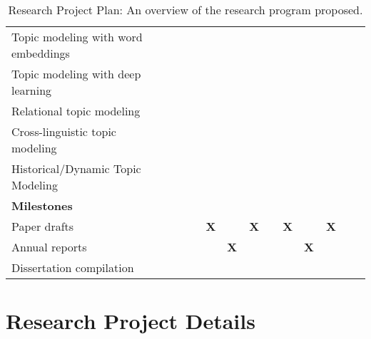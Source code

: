 \begin{table}
{\begin{tabular}{l|llcllllcllllcll|}
Topic modeling with word embeddings &  & \multicolumn{2}{l}{} & \cellcolor[HTML]{34FF34} & \cellcolor[HTML]{34FF34} &  & \multicolumn{2}{l}{} &  &  &  & \multicolumn{2}{l}{} &  &  \\
Topic modeling with deep learning &  & \multicolumn{2}{l}{} &  &  & \cellcolor[HTML]{34FF34} & \multicolumn{2}{l}{\cellcolor[HTML]{34FF34}} &  &  &  & \multicolumn{2}{l}{} &  &  \\
Relational topic modeling &  & \multicolumn{2}{l}{} &  &  &  & \multicolumn{2}{l}{} & \cellcolor[HTML]{34FF34} & \cellcolor[HTML]{34FF34} &  & \multicolumn{2}{l}{} &  &  \\
Cross-linguistic topic modeling &  & \multicolumn{2}{l}{} &  &  &  & \multicolumn{2}{l}{} &  &  & \cellcolor[HTML]{34FF34} & \multicolumn{2}{l}{\cellcolor[HTML]{34FF34}} & \cellcolor[HTML]{34FF34} &  \\
Historical/Dynamic Topic Modeling & & & & & \cellcolor[HTML]{34FF34} &\cellcolor[HTML]{34FF34} &\cellcolor[HTML]{34FF34} &\cellcolor[HTML]{34FF34} &\cellcolor[HTML]{34FF34} &\cellcolor[HTML]{34FF34} &\cellcolor[HTML]{34FF34} &\cellcolor[HTML]{34FF34} &\cellcolor[HTML]{34FF34} & \\
\textbf{Milestones} &  & \multicolumn{2}{l}{} &  &  &  & \multicolumn{2}{l}{} &  &  &  & \multicolumn{2}{l}{} &  &  \\
Paper drafts &  & \multicolumn{2}{c}{} & \multicolumn{1}{c}{\textbf{}} & \multicolumn{1}{c}{\textbf{X}} & \multicolumn{1}{c}{\textbf{}} & \multicolumn{2}{c}{\textbf{X}} & \multicolumn{1}{c}{\textbf{}} & \multicolumn{1}{c}{\textbf{X}} & \multicolumn{1}{c}{\textbf{}} & \multicolumn{2}{c}{\textbf{X}} & \multicolumn{1}{c}{\textbf{}} & \multicolumn{1}{c|}{} \\
Annual reports &  & \multicolumn{2}{l}{} &  &  & \textbf{X} & \multicolumn{2}{l}{} &  &  & \textbf{X} & \multicolumn{2}{l}{} &  &  \\
Dissertation compilation &  & \multicolumn{2}{l}{} &  &  &  & \multicolumn{2}{l}{} &  &  &  & \multicolumn{2}{l}{} & \cellcolor[HTML]{FE0000} & \cellcolor[HTML]{FE0000} \\ \cline{2-16} 
\end{tabular}%
}
\caption{Research Project Plan: An overview of the research program proposed.}
\label{researchplan}
\end{table}

\section{Research Project Details}

